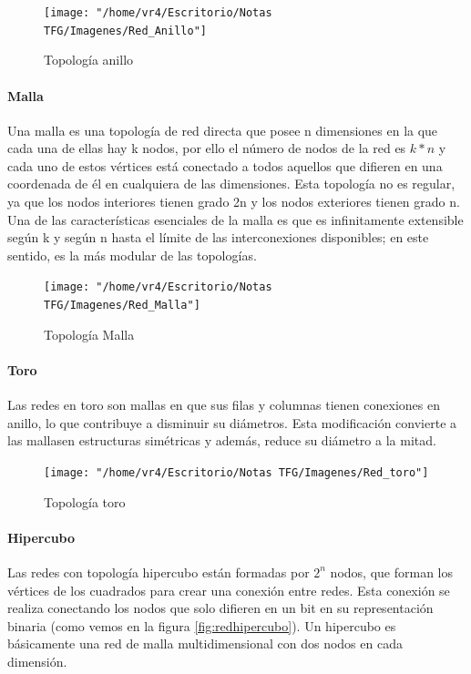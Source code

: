\begin{figure}[H]
	\centering
	\texttt{[image: "/home/vr4/Escritorio/Notas TFG/Imagenes/Red\_Anillo"]}
	\caption{Topología anillo}
	\label{fig:redanillo}
\end{figure}

\paragraph{Malla}
Una malla es una topología de red directa que posee n dimensiones en la que cada una de ellas hay k nodos, por ello el número de nodos de la red es $k*n$ y cada uno de estos vértices está conectado a todos aquellos que difieren en una coordenada de él en cualquiera de las dimensiones. Esta topología no es regular, ya que los nodos interiores tienen grado 2n y los nodos exteriores tienen grado n.\\
Una de las características esenciales de la malla es que es infinitamente extensible según k y según n hasta el límite de las interconexiones disponibles; en este sentido, es la más modular de las topologías.

\begin{figure}[H]
	\centering
	\texttt{[image: "/home/vr4/Escritorio/Notas TFG/Imagenes/Red\_Malla"]}
	\caption{Topología Malla}
	\label{fig:redmalla}
\end{figure}

\paragraph{Toro}
Las redes en toro son mallas en que sus filas y columnas tienen conexiones en anillo, lo que contribuye a disminuir su diámetros. Esta modificación convierte a las mallasen estructuras simétricas y además, reduce su diámetro a la mitad. 
\begin{figure}[H]
	\centering
	\texttt{[image: "/home/vr4/Escritorio/Notas TFG/Imagenes/Red\_toro"]}
	\caption{Topología toro}
	\label{fig:redtoro}
\end{figure}


\paragraph{Hipercubo}
Las redes con topología hipercubo están formadas por $2^{n}$ nodos, que forman los vértices de los cuadrados para crear una conexión entre redes. Esta conexión se realiza conectando los nodos que solo difieren en un bit en su representación binaria (como vemos en la figura \ref{fig:redhipercubo}). Un hipercubo es básicamente una red de malla multidimensional con dos nodos en cada dimensión.  

